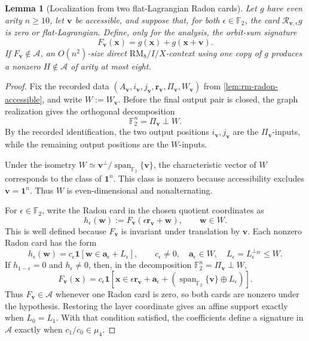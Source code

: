 \documentclass[11pt,letterpaper,onecolumn]{article}
\theoremstyle{plain}
\newtheorem{lemma}[lemma]{Lemma}
\theoremstyle{definition}
\theoremstyle{remark}
\newcommand{\Ftwo}{\mathbb F_2}
\newcommand{\cA}{\mathscr A}
\newcommand{\Span}{\operatorname{span}}
\newcommand{\one}{\mathbf 1}
\newcommand{\RMcore}{\mathrm{RM}_8}
\begin{document}
\begin{lemma}[Localization from two flat-Lagrangian Radon cards]
\label{lem:rm-two-chart-localization}
Let \(g\) have even arity \(n\ge10\), let \({\mathbf{v}}\) be accessible, and suppose
that, for both \(\epsilon\in\Ftwo\), the card
\(\mathcal R_{{\mathbf{v}},\epsilon}g\) is zero or flat-Lagrangian.  Define, only for
the analysis, the orbit-sum signature
\begin{equation*}
  F_{\mathbf{v}}({\mathbf{x}})=g({\mathbf{x}})+g({\mathbf{x}}+{\mathbf{v}}).
\end{equation*}
If \(F_{\mathbf{v}}\notin\cA\), an \(O(n^2)\)-size direct
\(\RMcore/I/X\)-context using one copy of \(g\) produces a nonzero
\(H\notin\cA\) of arity at most eight.
\end{lemma}

\begin{proof}
Fix the recorded data
\((A_{\mathbf{v}},i_{\mathbf{v}},j_{\mathbf{v}},{\mathbf{r}}_{\mathbf{v}},\Pi_{\mathbf{v}},W_{\mathbf{v}})\) from
\cref{lem:rm-radon-accessible}, and write \(W:=W_{\mathbf{v}}\).  Before the final
output pair is closed, the graph realization gives the orthogonal
decomposition
\[
 \Ftwo^n=\Pi_{\mathbf{v}}\perp W.
\]
By the recorded identification, the two output positions
\(i_{\mathbf{v}},j_{\mathbf{v}}\) are the \(\Pi_{\mathbf{v}}\)-inputs, while the remaining output positions are
the \(W\)-inputs.

Under the isometry \(W\simeq {\mathbf{v}}^\perp/\Span_{\Ftwo}\{{\mathbf{v}}\}\), the
characteristic vector of \(W\) corresponds to the class of \(\one^n\).
This class is nonzero because accessibility excludes \({\mathbf{v}}=\one^n\).
Thus \(W\) is even-dimensional and nonalternating.

For \(\epsilon\in\Ftwo\), write the Radon card in the chosen quotient coordinates as
\[
 h_\epsilon({\mathbf{w}}):=F_{\mathbf{v}}(\epsilon {\mathbf{r}}_{\mathbf{v}}+{\mathbf{w}}),
 \qquad {\mathbf{w}}\in W.
\]
This is well defined because \(F_{\mathbf{v}}\) is invariant under translation by
\({\mathbf{v}}\).  Each nonzero Radon card has the form
\[
 h_\epsilon({\mathbf{w}})
 =c_\epsilon\one[{\mathbf{w}}\in {\mathbf{a}}_\epsilon+L_\epsilon],
 \qquad
 c_\epsilon\ne0,\quad {\mathbf{a}}_\epsilon\in W,\quad
 L_\epsilon=L_\epsilon^{\perp_W}\le W.
\]
If \(h_{1-\epsilon}=0\) and \(h_\epsilon\ne0\), then, in the decomposition
\(\Ftwo^n=\Pi_{\mathbf{v}}\perp W\),
\[
 F_{\mathbf{v}}({\mathbf{x}})
 =c_\epsilon\one[
   {\mathbf{x}}\in\epsilon {\mathbf{r}}_{\mathbf{v}}+{\mathbf{a}}_\epsilon+
        (\Span_{\Ftwo}\{{\mathbf{v}}\}\oplus L_\epsilon)].
\]
Thus \(F_{\mathbf{v}}\in\cA\) whenever one Radon card is zero, so
both cards are nonzero under the hypothesis. Restoring the layer
coordinate gives an affine support exactly when \(L_0=L_1\).
With that condition satisfied, the coefficients define a signature in
\(\cA\) exactly when \(c_1/c_0\in\mu_4\).


\end{proof}
\end{document}
